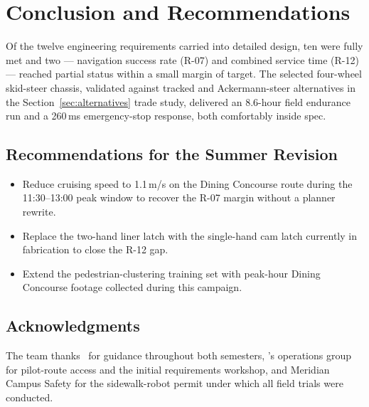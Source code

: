 \section{Conclusion and Recommendations}
\label{sec:conclusion}

Of the twelve engineering requirements carried into detailed design, ten were
fully met and two --- navigation success rate (R-07) and combined service
time (R-12) --- reached partial status within a small margin of target. The
selected four-wheel skid-steer chassis, validated against tracked and
Ackermann-steer alternatives in the Section~\ref{sec:alternatives} trade
study, delivered an 8.6-hour field endurance run and a 260\,ms emergency-stop
response, both comfortably inside spec.

\subsection{Recommendations for the Summer Revision}
\begin{itemize}[leftmargin=1.4em]
  \item Reduce cruising speed to 1.1\,m/s on the Dining Concourse route
        during the 11:30--13:00 peak window to recover the R-07 margin
        without a planner rewrite.
  \item Replace the two-hand liner latch with the single-hand cam latch
        currently in fabrication to close the R-12 gap.
  \item Extend the pedestrian-clustering training set with peak-hour
        Dining Concourse footage collected during this campaign.
\end{itemize}

\subsection{Acknowledgments}
The team thanks \ProjectAdvisor\ for guidance throughout both semesters,
\ProjectSponsor's operations group for pilot-route access and the initial
requirements workshop, and Meridian Campus Safety for the sidewalk-robot
permit under which all field trials were conducted.
